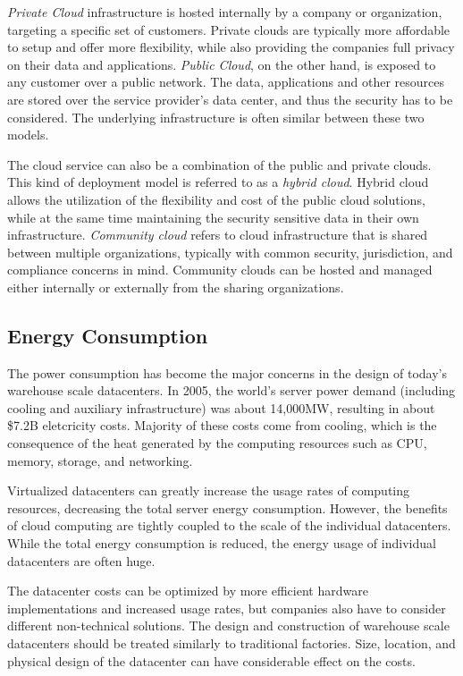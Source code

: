 \emph{Private Cloud} infrastructure is hosted internally by a company or organization, targeting a specific set of customers. Private clouds are typically more affordable to setup and offer more flexibility, while also providing the companies full privacy on their data and applications. \emph{Public Cloud}, on the other hand, is exposed to any customer over a public network. The data, applications and other resources are stored over the service provider's data center, and thus the security has to be considered. The underlying infrastructure is often similar between these two models.~\cite{Mell:2011:ccdef}

The cloud service can also be a combination of the public and private clouds. This kind of deployment model is referred to as a \emph{hybrid cloud}. Hybrid cloud allows the utilization of the flexibility and cost of the public cloud solutions, while at the same time maintaining the security sensitive data in their own infrastructure. \emph{Community cloud} refers to cloud infrastructure that is shared between multiple organizations, typically with common security, jurisdiction, and compliance concerns in mind. Community clouds can be hosted and managed either internally or externally from the sharing organizations.~\cite{Mell:2011:ccdef}

\subsection{Energy Consumption}
The power consumption has become the major concerns in the design of today's warehouse scale datacenters. In 2005, the world's server power demand (including cooling and auxiliary infrastructure) was about 14,000MW, resulting in about \$7.2B eletcricity costs. Majority of these costs come from cooling, which is the consequence of the heat generated by the computing resources such as CPU, memory, storage, and networking.~\cite{Koomey:2007:PC, Fan:2007:PPW}

Virtualized datacenters can greatly increase the usage rates of computing resources, decreasing the total server energy consumption. However, the benefits of cloud computing are tightly coupled to the scale of the individual datacenters. While the total energy consumption is reduced, the energy usage of individual datacenters are often huge.~\cite{Hoelzle:2009:DCI}

The datacenter costs can be optimized by more efficient hardware implementations and increased usage rates, but companies also have to consider different non-technical solutions. The design and construction of warehouse scale datacenters should be treated similarly to traditional factories. Size, location, and physical design of the datacenter can have considerable effect on the costs.~\cite{Hoelzle:2009:DCI}

